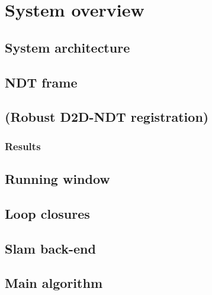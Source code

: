 \chapter{System overview}

\section{System architecture}
\newpage
\section{NDT frame}
\newpage
\section{(Robust D2D-NDT registration)}
\subsection{Results}
\newpage
\section{Running window}
\newpage
\section{Loop closures}
\newpage
\section{Slam back-end}
\newpage
\section{Main algorithm}